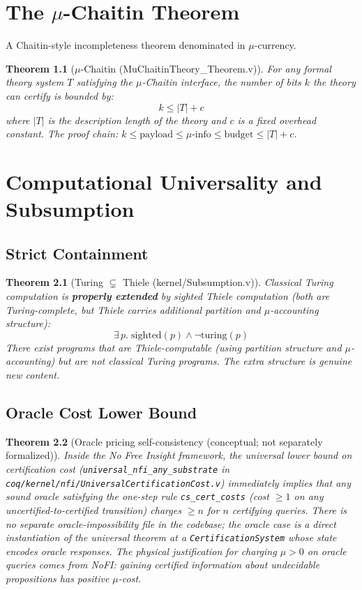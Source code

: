 \documentclass[11pt, a4paper]{report}
\theoremstyle{definition}
\theoremstyle{plain}
\newtheorem{theorem}{Theorem}[chapter]
\begin{document}
\chapter{The $\mu$-Chaitin Theorem}

A Chaitin-style incompleteness theorem denominated in $\mu$-currency.

\begin{theorem}[$\mu$-Chaitin {\normalfont (MuChaitinTheory\_Theorem.v)}]
For any formal theory system $T$ satisfying the $\mu$-Chaitin interface, the number of bits $k$ the theory can certify is bounded by:
\[ k \le |T| + c \]
where $|T|$ is the description length of the theory and $c$ is a fixed overhead constant. The proof chain: $k \le \mathrm{payload} \le \mu\text{-info} \le \mathrm{budget} \le |T| + c$.
\end{theorem}
\chapter{Computational Universality and Subsumption}
\section{Strict Containment}

\begin{theorem}[Turing $\subsetneq$ Thiele {\normalfont (kernel/Subsumption.v)}]
Classical Turing computation is \textbf{properly extended} by sighted Thiele computation (both are Turing-complete, but Thiele carries additional partition and $\mu$-accounting structure):
\[ \exists\, p.\; \mathrm{sighted}(p) \wedge \neg\mathrm{turing}(p) \]
There exist programs that are Thiele-computable (using partition structure and $\mu$-accounting) but are not classical Turing programs. The extra structure is genuine new content.
\end{theorem}
\section{Oracle Cost Lower Bound}
\begin{theorem}[Oracle pricing self-consistency (conceptual; not separately formalized)]
Inside the No Free Insight framework, the universal lower bound on certification cost (\texttt{universal\_nfi\_any\_substrate} in \texttt{coq/kernel/nfi/UniversalCertificationCost.v}) immediately implies that any sound oracle satisfying the one-step rule \texttt{cs\_cert\_costs} (cost $\ge 1$ on any uncertified-to-certified transition) charges $\ge n$ for $n$ certifying queries. There is no separate oracle-impossibility file in the codebase; the oracle case is a direct instantiation of the universal theorem at a \texttt{CertificationSystem} whose state encodes oracle responses. The physical justification for charging $\mu > 0$ on oracle queries comes from NoFI: gaining certified information about undecidable propositions has positive $\mu$-cost.
\end{theorem}
\end{document}
